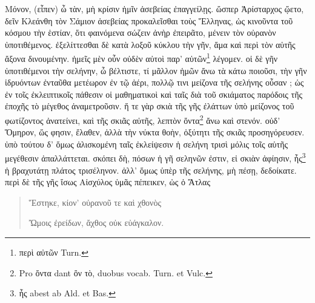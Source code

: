 \documentclass[a4paper, 11pt, oneside, polutonikogreek, german]{article}
\begin{document}
Μόνον, (εἶπεν) ὦ τὰν, μὴ κρίσιν ἡμῖν ἀσεβείας ἐπαγγείλῃς. ὥσπερ Ἀρίσταρχος ᾤετο, δεῖν Κλεάνθη τὸν Σάμιον ἀσεβείας προκαλεῖσθαι τοὺς Ἕλληνας, ὡς κινοῦντα τοῦ κόσμου τὴν ἑστίαν, ὅτι φαινόμενα σώζειν ἀνὴρ ἐπειρᾶτο, μένειν τὸν οὐρανὸν ὑποτιθέμενος. ἐξελίττεσθαι δὲ κατὰ λοξοῦ κύκλου τὴν γῆν, ἅμα καὶ περὶ τὸν αὑτῆς ἄξονα δινουμένην. ἡμεῖς μὲν οὖν οὐδὲν αὐτοὶ παρ' αὑτῶν\footnote{περὶ αὐτῶν Turn.} λέγομεν. οἱ δὲ γῆν ὑποτιθέμενοι τὴν σελήνην, ὦ βέλτιστε, τί μᾶλλον ἡμῶν ἄνω τὰ κάτω ποιοῦσι, τὴν γῆν ἱδρυόντων ἐνταῦθα μετέωρον ἐν τῷ ἀέρι, πολλῷ τινι μείζονα τῆς σελήνης οὖσαν ; ὡς ἐν τοῖς ἐκλειπτικοῖς πάθεσιν οἱ μαθηματικοὶ καὶ ταῖς διὰ τοῦ σκιάματος παρόδοις τῆς ἐποχῆς τὸ μέγεθος ἀναμετροῦσιν. ἥ τε γὰρ σκιὰ τῆς γῆς ἐλάττων ὑπὸ μείζονος τοῦ φωτίζοντος ἀνατείνει, καὶ τῆς σκιᾶς αὐτῆς, λεπτὸν ὄντα\footnote{Pro ὄντα dant ὂν τὸ, duobus vocab. Turn. et Vulc.} ἄνω καὶ στενόν. οὐδ' Ὅμηρον, ὥς φησιν, ἔλαθεν, ἀλλὰ τὴν νύκτα θοὴν, ὀξύτητι τῆς σκιᾶς προσηγόρευσεν. ὑπὸ τούτου δ' ὅμως ἁλισκομένη ταῖς ἐκλείψεσιν ἡ σελήνη τρισὶ μόλις τοῖς αὑτῆς μεγέθεσιν ἀπαλλάττεται. σκόπει δὴ, πόσων ἡ γῆ σεληνῶν ἐστιν, εἰ σκιὰν ἀφίησιν, ἧς\footnote{ἧς abest ab Ald. et Bas.} ἡ βραχυτάτῃ πλάτος τρισέληνον. ἀλλ' ὅμως ὑπὲρ τῆς σελήνης, μὴ πέσῃ, δεδοίκατε. περὶ δὲ τῆς γῆς ἴσως Αἰσχύλος ὑμᾶς πέπεικεν, ὡς ὁ Ἄτλας
\begin{quotation}\small
Ἕστηκε, κίον' οὐρανοῦ τε καὶ χθονὸς

Ὤμοις ἐρείδων, ἄχθος οὐκ εὐάγκαλον.
\end{quotation}
\end{document}

